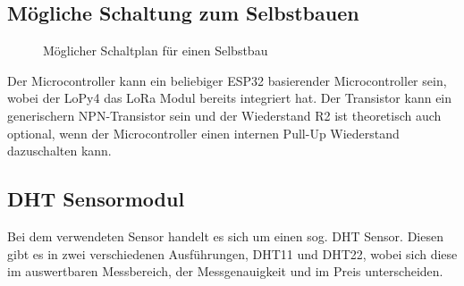 \subsection{Mögliche Schaltung zum Selbstbauen} \label{LoPy4}

\begin{center}
	\begin{figure}[h]
	 
	 \noindent{}
	 \caption[Möglicher Schaltplan für einen Selbstbau]{Möglicher Schaltplan für einen Selbstbau}
	 \label{fig:dhtkommunikation}
	\end{figure}
\end{center}

Der Microcontroller kann ein beliebiger ESP32 basierender Microcontroller sein, wobei der LoPy4 das LoRa Modul bereits integriert hat. Der Transistor kann ein generischern NPN-Transistor sein und der Wiederstand R2 ist theoretisch auch optional, wenn der Microcontroller einen internen Pull-Up Wiederstand dazuschalten kann.

\subsection{DHT Sensormodul} \label{DHT}

Bei dem verwendeten Sensor handelt es sich um einen sog. DHT Sensor. Diesen gibt es in zwei verschiedenen Ausführungen, DHT11 und DHT22, wobei sich diese im auswertbaren Messbereich, der Messgenauigkeit und im Preis unterscheiden.


